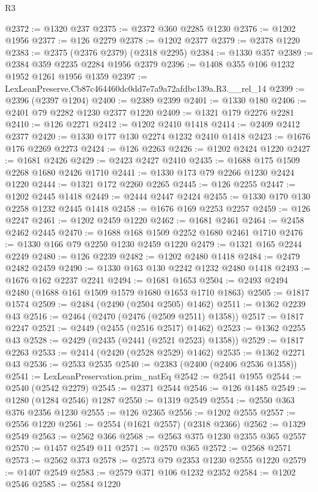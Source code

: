 \begin{lexlean}{R3}
\begin{coremodule}
@2372 := @1320 @237
@2375 := @2372 @360 @2285 @1230
@2376 := @1202 @1956
@2377 := @126 @2279
@2378 := @1202 @2377
@2379 := @2378 @1220
@2383 := @2375 (@2376 @2379) (@2318 @2295)
@2384 := @1330 @357
@2389 := @2384 @359 @2235 @2284 @1956 @2379
@2396 := @1408 @355 @106 @1232 @1952 @1261 @1956 @1359
@2397 := LexLeanPreserve.Cb87c464460dc0dd7e7a9a72afdbc139a.R3.__rel_14
@2399 := @2396 (@2397 @1204)
@2400 := @2389 @2399
@2401 := @1330 @180
@2406 := @2401 @79 @2282 @1230 @2377 @1220
@2409 := @1321 @179 @2276 @2281
@2410 := @126 @2271
@2412 := @1202 @2410 @1418
@2414 := @2409 @2412 @2377
@2420 := @1330 @177 @130 @2274 @1232 @2410 @1418
@2423 := @1676 @176 @2269 @2273
@2424 := @126 @2263
@2426 := @1202 @2424 @1220
@2427 := @1681 @2426
@2429 := @2423 @2427 @2410
@2435 := @1688 @175 @1509 @2268 @1680 @2426 @1710
@2441 := @1330 @173 @79 @2266 @1230 @2424 @1220
@2444 := @1321 @172 @2260 @2265
@2445 := @126 @2255
@2447 := @1202 @2445 @1418
@2449 := @2444 @2447 @2424
@2455 := @1330 @170 @130 @2258 @1232 @2445 @1418
@2458 := @1676 @169 @2253 @2257
@2459 := @126 @2247
@2461 := @1202 @2459 @1220
@2462 := @1681 @2461
@2464 := @2458 @2462 @2445
@2470 := @1688 @168 @1509 @2252 @1680 @2461 @1710
@2476 := @1330 @166 @79 @2250 @1230 @2459 @1220
@2479 := @1321 @165 @2244 @2249
@2480 := @126 @2239
@2482 := @1202 @2480 @1418
@2484 := @2479 @2482 @2459
@2490 := @1330 @163 @130 @2242 @1232 @2480 @1418
@2493 := @1676 @162 @2237 @2241
@2494 := @1681 @1653
@2504 := @2493 @2494 @2480 (@1688 @161 @1509 @1579 @1680 @1653 @1710 @1863)
@2505 := @1817 @1574
@2509 := @2484 (@2490 (@2504 @2505) @1462)
@2511 := @1362 @2239 @43
@2516 := @2464 (@2470 (@2476 (@2509 @2511) @1358))
@2517 := @1817 @2247
@2521 := @2449 (@2455 (@2516 @2517) @1462)
@2523 := @1362 @2255 @43
@2528 := @2429 (@2435 (@2441 (@2521 @2523) @1358))
@2529 := @1817 @2263
@2533 := @2414 (@2420 (@2528 @2529) @1462)
@2535 := @1362 @2271 @43
@2536 := @2533 @2535
@2540 := @2383 (@2400 (@2406 @2536 @1358))
@2541 := LexLeanPreservation.prim_natEq
@2542 := @2541 @1955
@2544 := @2540 (@2542 @2279)
@2545 := @2371 @2544
@2546 := @126 @1485
@2549 := @1280 (@1284 @2546) @1287
@2550 := @1319 @2549
@2554 := @2550 @363 @376 @2356 @1230
@2555 := @126 @2365
@2556 := @1202 @2555
@2557 := @2556 @1220
@2561 := @2554 (@1621 @2557) (@2318 @2366)
@2562 := @1329 @2549
@2563 := @2562 @366
@2568 := @2563 @375 @1230 @2355 @365 @2557
@2570 := @1457 @2549 @11
@2571 := @2570 @365
@2572 := @2568 @2571
@2573 := @2562 @373
@2578 := @2573 @79 @2353 @1230 @2555 @1220
@2579 := @1407 @2549
@2583 := @2579 @371 @106 @1232 @2352
@2584 := @1202 @2546
@2585 := @2584 @1220

\end{coremodule}
\end{lexlean}
